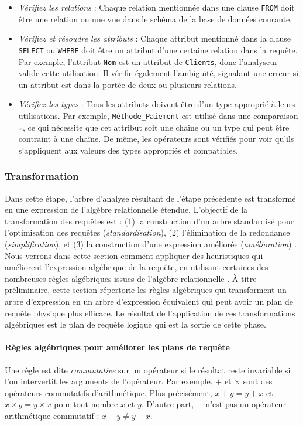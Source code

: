 \begin{itemize}
 \item \textit{Vérifiez les relations} : Chaque relation mentionnée dans une clause \texttt{FROM} doit être une relation ou une vue dans le schéma de la base de données courante.
 \item \textit{Vérifiez et résoudre les attributs} : Chaque attribut mentionné dans la clause \texttt{SELECT} ou \texttt{WHERE} doit être un attribut d'une certaine relation dans la requête. Par exemple, l'attribut \texttt{Nom} est un attribut de \texttt{Clients}, donc l'analyseur valide cette utilisation. Il vérifie également l'ambiguïté, signalant une erreur si un attribut est dans la portée de deux ou plusieurs relations.
 \item \textit{Vérifiez les types} : Tous les attributs doivent être d'un type approprié à leurs utilisations. Par exemple, \texttt{Méthode\_Paiement} est utilisé dans une comparaison \texttt{=}, ce qui nécessite que cet attribut soit une chaîne ou un type qui peut être contraint à une chaîne. De même, les opérateurs sont vérifiés pour voir qu'ils s'appliquent aux valeurs des types appropriés et compatibles.
\end{itemize}

\subsubsection{Transformation}\label{sec:transformation}
Dans cette étape, l'arbre d'analyse résultant de l'étape précédente est transformé en une expression de l'algèbre relationnelle étendue.
L'objectif de la transformation des requêtes est : (1) la construction d'un arbre standardisé pour l'optimisation des requêtes (\textit{standardisation}), (2) l'élimination de la redondance (\textit{simplification}), et (3) la construction d'une expression améliorée (\textit{amélioration}) \cite{Jarke84}.
Nous verrons dans cette section comment appliquer des heuristiques qui améliorent l'expression algébrique de la requête, en utilisant certaines des nombreuses règles algébriques issues de l'algèbre relationnelle \cite{Elmasri08}. À titre préliminaire, cette section répertorie les règles algébriques qui transforment un arbre d'expression en un arbre d'expression équivalent qui peut avoir un plan de requête physique plus efficace. Le résultat de l'application de ces transformations algébriques est le plan de requête logique qui est la sortie de cette phase.

\paragraph{Règles algébriques pour améliorer les plans de requête}
Une règle est dite \textit{commutative} sur un opérateur si le résultat reste invariable si l'on intervertit les arguments de l'opérateur. Par exemple, $+$ et $\times$ sont des opérateurs commutatifs d'arithmétique. Plus précisément, $x + y = y + x$ et $x \times y = y \times x$ pour tout nombre $x$ et $y$. D'autre part, $-$ n'est pas un opérateur arithmétique commutatif : $x - y \neq y - x$.

